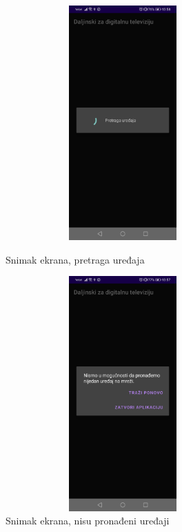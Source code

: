 \documentclass[implementacija.tex]{subfiles}
\begin{document}
\begin{figure}[h!]
\centering
\begin{minipage}{.5\textwidth}
  \centering
  \includegraphics[width=9cm,height=9cm,keepaspectratio]{Implementacija/snimci_ekrana/3_pretraga_uredjaja.jpg}
  \caption{Snimak ekrana, pretraga uređaja}
   \label{fig:pretraga}
\end{minipage}%
\begin{minipage}{.5\textwidth}
   \centering
  \includegraphics[width=9cm,height=9cm,keepaspectratio]{Implementacija/snimci_ekrana/4_uredjaji_nisu_pronadjeni.jpg}
  \caption{Snimak ekrana, nisu pronađeni uređaji}
   \label{fig:nema_uredjaja}
\end{minipage}
\end{figure}
\end{document}
